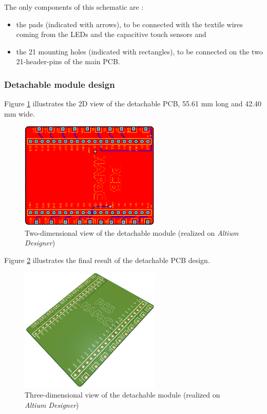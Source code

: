 The only components of this schematic are :

\begin{itemize}
    \item the pads (indicated with arrows), to be connected with the textile wires coming from the LEDs and the capacitive touch sensors and 
    \item the 21 mounting holes (indicated with rectangles), to be connected on the two 21-header-pins of the main PCB.
\end{itemize}


\subsubsection{Detachable module design}
\label{subsubsec:detachable_module/design} 

Figure \ref{fig:detachable_module_2D} illustrates the 2D view of the detachable PCB, 55.61 mm long and 42.40 mm wide.

\begin{figure}[H]
    \centering
    \includegraphics[width=0.6\textwidth]{images/EE_DetachableModule_2D.PNG}
    \caption{Two-dimensional view of the detachable module (realized on \textit{Altium Designer})}
    \label{fig:detachable_module_2D}
\end{figure}

Figure \ref{fig:detachable_module_3D} illustrates the final result of the detachable PCB design.

\begin{figure}[H]
    \centering
    \includegraphics[width=0.6\textwidth]{images/EE_DetachableModule_3D.PNG}
    \caption{Three-dimensional view of the detachable module (realized on \textit{Altium Designer})}
    \label{fig:detachable_module_3D}
\end{figure}

